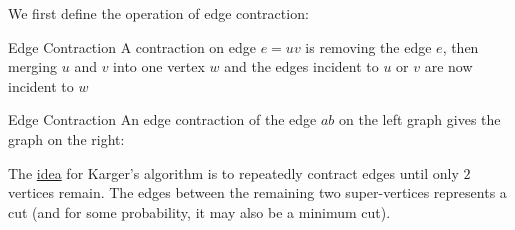 We first define the operation of edge contraction:
\begin{definition}{Edge Contraction}{}
    A contraction on edge $e = uv$ is removing the edge $e$, then merging $u$ and $v$ into one vertex $w$ and the edges incident to $u$ or $v$ are now incident to $w$
\end{definition}
\begin{example}{Edge Contraction}{}
    An edge contraction of the edge $ab$ on the left graph gives the graph on the right:

    \begin{minipage}{0.5\textwidth}
        \centering
    \end{minipage}
    \begin{minipage}{0.5\textwidth}
        \centering
    \end{minipage}
\end{example}

The \underline{idea} for Karger's algorithm is to repeatedly contract edges until only $2$ vertices remain.
The edges between the remaining two super-vertices represents a cut (and for some probability, it may also be a minimum cut).

